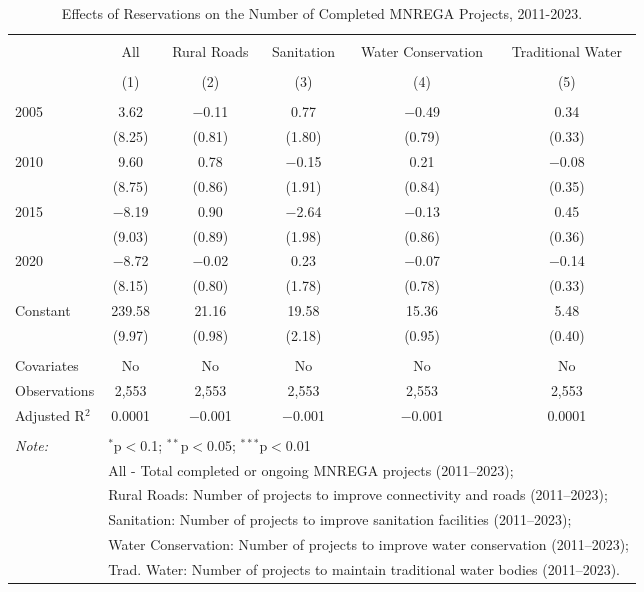 
\begin{table}[!htbp] \centering 
  \caption{Effects of Reservations on the Number of Completed MNREGA Projects, 2011-2023.} 
  \label{main_mnrega_2011_2023_dosage} 
\scriptsize 
\begin{tabular}{@{\extracolsep{1pt}}lccccc} 
\\[-1.8ex]\hline 
\hline \\[-1.8ex] 
 & All & Rural Roads & Sanitation & Water Conservation & Traditional Water \\ 
\\[-1.8ex] & (1) & (2) & (3) & (4) & (5)\\ 
\hline \\[-1.8ex] 
 2005 & 3.62 & $-$0.11 & 0.77 & $-$0.49 & 0.34 \\ 
  & (8.25) & (0.81) & (1.80) & (0.79) & (0.33) \\ 
  2010 & 9.60 & 0.78 & $-$0.15 & 0.21 & $-$0.08 \\ 
  & (8.75) & (0.86) & (1.91) & (0.84) & (0.35) \\ 
  2015 & $-$8.19 & 0.90 & $-$2.64 & $-$0.13 & 0.45 \\ 
  & (9.03) & (0.89) & (1.98) & (0.86) & (0.36) \\ 
  2020 & $-$8.72 & $-$0.02 & 0.23 & $-$0.07 & $-$0.14 \\ 
  & (8.15) & (0.80) & (1.78) & (0.78) & (0.33) \\ 
  Constant & 239.58 & 21.16 & 19.58 & 15.36 & 5.48 \\ 
  & (9.97) & (0.98) & (2.18) & (0.95) & (0.40) \\ 
 \hline \\[-1.8ex] 
Covariates & No & No & No & No & No \\ 
Observations & 2,553 & 2,553 & 2,553 & 2,553 & 2,553 \\ 
Adjusted R$^{2}$ & 0.0001 & $-$0.001 & $-$0.001 & $-$0.001 & 0.0001 \\ 
\hline 
\hline \\[-1.8ex] 
\textit{Note:}  & \multicolumn{5}{l}{$^{*}$p$<$0.1; $^{**}$p$<$0.05; $^{***}$p$<$0.01} \\ 
 & \multicolumn{5}{l}{All - Total completed or ongoing MNREGA projects (2011--2023);} \\ 
 & \multicolumn{5}{l}{Rural Roads: Number of projects to improve connectivity and roads (2011--2023);} \\ 
 & \multicolumn{5}{l}{Sanitation:  Number of projects to improve sanitation facilities  (2011--2023);} \\ 
 & \multicolumn{5}{l}{Water Conservation: Number of projects to improve water conservation (2011--2023);} \\ 
 & \multicolumn{5}{l}{Trad. Water: Number of projects to maintain traditional water bodies (2011--2023).} \\ 
\end{tabular} 
\end{table} 
